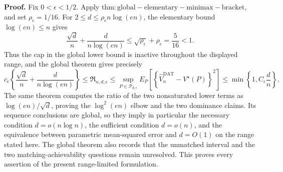 \textbf{Proof.}
Fix \(0<\epsilon<1/2\).  Apply \(\mathrm{thm:global-elementary-minimax-bracket}\), and set \(\rho_\epsilon=1/16\).  For \(2\leq d\leq\rho_\epsilon n\log(en)\), the elementary bound \(\log(en)\leq n\) gives
\[
 \frac{\sqrt d}{n}+\frac d{n\log(en)}
 \leq\sqrt{\rho_\epsilon}+\rho_\epsilon
 =\frac5{16}<1.
\]
Thus the cap in the global lower bound is inactive throughout the displayed range, and the global theorem gives precisely
\[
 c_\epsilon\left\{\frac{\sqrt d}{n}+\frac d{n\log(en)}\right\}
 \leq\mathfrak R_{n,d,\epsilon}
 \leq\sup_{P\in\mathcal P_{d,\epsilon}}
 E_P\!\left[
  \left\{\widehat V_n^{\mathrm{DAT}}-V^\star(P)\right\}^2
 \right]
 \leq\min\!\left\{1,C_\epsilon\frac dn\right\}.
\]
The same theorem computes the ratio of the two nonsaturated lower terms as \(\log(en)/\sqrt d\), proving the \(\log^2(en)\) elbow and the two dominance claims.  Its sequence conclusions are global, so they imply in particular the necessary condition \(d=o(n\log n)\), the sufficient condition \(d=o(n)\), and the equivalence between parametric mean-squared error and \(d=O(1)\) on the range stated here.  The global theorem also records that the unmatched interval and the two matching-achievability questions remain unresolved.  This proves every assertion of the present range-limited formulation.